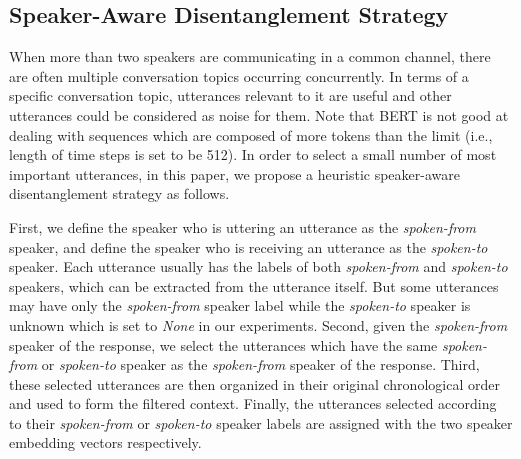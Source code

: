 \documentclass[sigconf]{acmart}
\begin{document}
  \subsection{Speaker-Aware Disentanglement Strategy}
    When more than two speakers are communicating in a common channel, there are often multiple conversation topics occurring concurrently.
    In terms of a specific conversation topic, utterances relevant to it are useful and other utterances could be considered as noise for them.
    Note that BERT is not good at dealing with sequences which are composed of more tokens than the limit (i.e., length of time steps is set to be 512).
    In order to select a small number of most important utterances, in this paper, we propose a heuristic speaker-aware disentanglement strategy as follows.

    First, we define the speaker who is uttering an utterance as the \emph{spoken-from} speaker, and define the speaker who is receiving an utterance as the \emph{spoken-to} speaker.
    Each utterance usually has the labels of both \emph{spoken-from} and \emph{spoken-to} speakers, which can be extracted from the utterance itself. 
    But some utterances may have only the \emph{spoken-from} speaker label while the \emph{spoken-to} speaker is unknown which is set to \emph{None} in our experiments.
    Second, given the \emph{spoken-from} speaker of the response, we select the utterances which have the same \emph{spoken-from} or \emph{spoken-to} speaker as the \emph{spoken-from} speaker of the response.
    Third, these selected utterances are then organized in their original chronological order and used to form the filtered context.
    Finally, the utterances selected according to their \emph{spoken-from} or \emph{spoken-to} speaker labels are assigned with the two speaker embedding vectors respectively.
    
\end{document}
